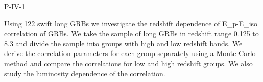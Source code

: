 P-IV-1


\bigskip



\bigskip

\noindent Using 122 swift long GRBs we investigate the redshift dependence of E_p-E_{iso} correlation of GRBs. 
We take the sample of long GRBs in redshift range 0.125 to 8.3 and 
divide the sample into groups with high and low redshift bands. We derive the correlation parameters for each group separately using a Monte Carlo method and compare the correlations for low and high redshift groups.
We also study the luminosity dependence of the correlation.

